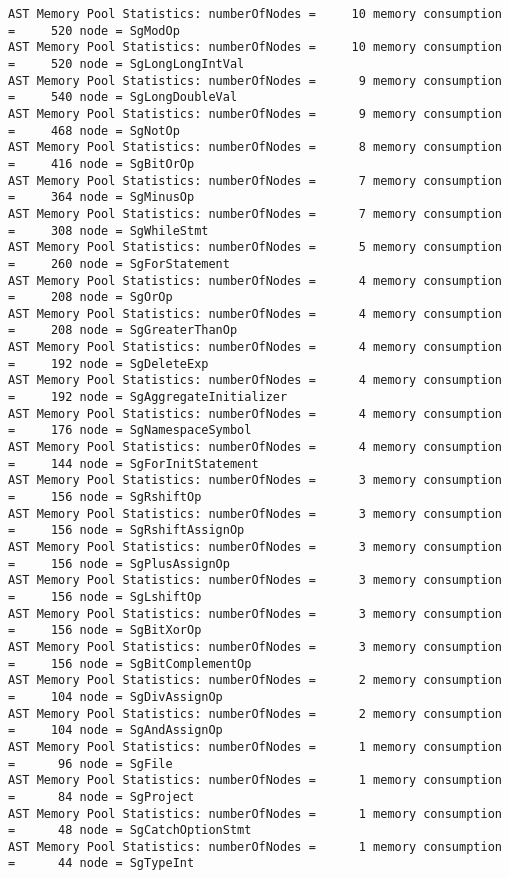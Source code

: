 {\begin{verbatim}
AST Memory Pool Statistics: numberOfNodes =     10 memory consumption =     520 node = SgModOp
AST Memory Pool Statistics: numberOfNodes =     10 memory consumption =     520 node = SgLongLongIntVal
AST Memory Pool Statistics: numberOfNodes =      9 memory consumption =     540 node = SgLongDoubleVal
AST Memory Pool Statistics: numberOfNodes =      9 memory consumption =     468 node = SgNotOp
AST Memory Pool Statistics: numberOfNodes =      8 memory consumption =     416 node = SgBitOrOp
AST Memory Pool Statistics: numberOfNodes =      7 memory consumption =     364 node = SgMinusOp
AST Memory Pool Statistics: numberOfNodes =      7 memory consumption =     308 node = SgWhileStmt
AST Memory Pool Statistics: numberOfNodes =      5 memory consumption =     260 node = SgForStatement
AST Memory Pool Statistics: numberOfNodes =      4 memory consumption =     208 node = SgOrOp
AST Memory Pool Statistics: numberOfNodes =      4 memory consumption =     208 node = SgGreaterThanOp
AST Memory Pool Statistics: numberOfNodes =      4 memory consumption =     192 node = SgDeleteExp
AST Memory Pool Statistics: numberOfNodes =      4 memory consumption =     192 node = SgAggregateInitializer
AST Memory Pool Statistics: numberOfNodes =      4 memory consumption =     176 node = SgNamespaceSymbol
AST Memory Pool Statistics: numberOfNodes =      4 memory consumption =     144 node = SgForInitStatement
AST Memory Pool Statistics: numberOfNodes =      3 memory consumption =     156 node = SgRshiftOp
AST Memory Pool Statistics: numberOfNodes =      3 memory consumption =     156 node = SgRshiftAssignOp
AST Memory Pool Statistics: numberOfNodes =      3 memory consumption =     156 node = SgPlusAssignOp
AST Memory Pool Statistics: numberOfNodes =      3 memory consumption =     156 node = SgLshiftOp
AST Memory Pool Statistics: numberOfNodes =      3 memory consumption =     156 node = SgBitXorOp
AST Memory Pool Statistics: numberOfNodes =      3 memory consumption =     156 node = SgBitComplementOp
AST Memory Pool Statistics: numberOfNodes =      2 memory consumption =     104 node = SgDivAssignOp
AST Memory Pool Statistics: numberOfNodes =      2 memory consumption =     104 node = SgAndAssignOp
AST Memory Pool Statistics: numberOfNodes =      1 memory consumption =      96 node = SgFile
AST Memory Pool Statistics: numberOfNodes =      1 memory consumption =      84 node = SgProject
AST Memory Pool Statistics: numberOfNodes =      1 memory consumption =      48 node = SgCatchOptionStmt
AST Memory Pool Statistics: numberOfNodes =      1 memory consumption =      44 node = SgTypeInt

\end{verbatim}}
